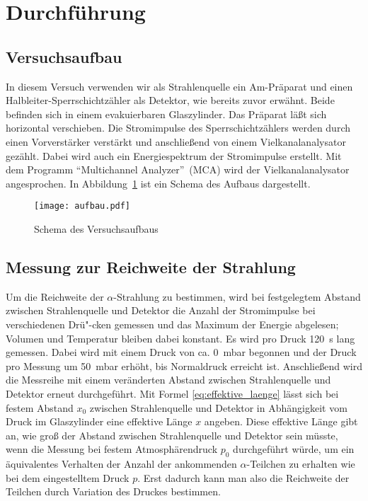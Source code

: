 
\section{Durchführung}

\subsection{Versuchsaufbau}

In diesem Versuch verwenden wir als Strahlenquelle ein Am-Präparat und
einen Halbleiter-Sperrschichtzähler als Detektor, wie bereits zuvor
erwähnt. Beide befinden sich in einem evakuierbaren Glaszylinder. Das
Präparat läßt sich horizontal verschieben. Die Stromimpulse des
Sperrschichtzählers werden durch einen Vorverstärker verstärkt und
anschließend von einem Vielkanalanalysator gezählt. Dabei wird auch ein
Energiespektrum der Stromimpulse erstellt. Mit dem Programm
\enquote{Multichannel Analyzer}~(MCA) wird der Vielkanalanalysator
angesprochen. In Abbildung~\ref{fig:schema-aufbau} ist ein Schema des
Aufbaus dargestellt.

\begin{figure}
  \centering
  \texttt{[image: aufbau.pdf]}
  \caption{Schema des Versuchsaufbaus}
  \label{fig:schema-aufbau}
\end{figure}

\subsection{Messung zur Reichweite der Strahlung}

Um die Reichweite der $\alpha$-Strahlung zu bestimmen, wird bei
festgelegtem Abstand zwischen Strahlenquelle und Detektor die Anzahl der
Stromimpulse bei verschiedenen Drü"-cken gemessen und das Maximum der
Energie abgelesen; Volumen und Temperatur bleiben dabei konstant. Es
wird pro Druck \SI{120}{\second} lang gemessen. Dabei wird mit einem
Druck von ca. \SI{0}{\milli\bar} begonnen und der Druck pro Messung um
\SI{50}{\milli\bar} erhöht, bis Normaldruck erreicht ist. Anschließend
wird die Messreihe mit einem veränderten Abstand zwischen Strahlenquelle
und Detektor erneut durchgeführt.  Mit Formel
\eqref{eq:effektive_laenge} lässt sich bei festem Abstand $x_0$ zwischen
Strahlenquelle und Detektor in Abhängigkeit vom Druck im Glaszylinder
eine effektive Länge $x$ angeben. Diese effektive Länge gibt an, wie
groß der Abstand zwischen Strahlenquelle und Detektor sein müsste, wenn
die Messung bei festem Atmosphärendruck $p_0$ durchgeführt würde, um ein
äquivalentes Verhalten der Anzahl der ankommenden $\alpha$-Teilchen zu
erhalten wie bei dem eingestelltem Druck $p$. Erst dadurch kann man also
die Reichweite der Teilchen durch Variation des Druckes bestimmen.

